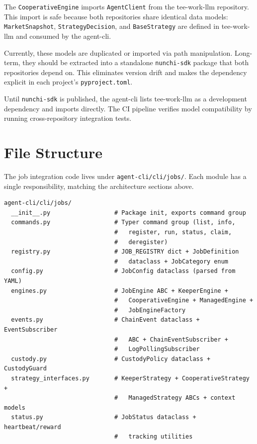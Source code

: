 \documentclass[11pt,a4paper]{article}
\begin{document}
\begin{designbox}
The \texttt{CooperativeEngine} imports \texttt{AgentClient} from the tee-work-llm
repository. This import is safe because both repositories share identical data
models: \texttt{MarketSnapshot}, \texttt{StrategyDecision}, and \texttt{BaseStrategy}
are defined in tee-work-llm and consumed by the agent-cli.

Currently, these models are duplicated or imported via path manipulation. Long-term,
they should be extracted into a standalone \texttt{nunchi-sdk} package that both
repositories depend on. This eliminates version drift and makes the dependency
explicit in each project's \texttt{pyproject.toml}.

Until \texttt{nunchi-sdk} is published, the agent-cli lists tee-work-llm as a
development dependency and imports directly. The CI pipeline verifies model
compatibility by running cross-repository integration tests.
\end{designbox}

\section{File Structure}

The job integration code lives under \texttt{agent-cli/cli/jobs/}. Each module
has a single responsibility, matching the architecture sections above.

\begin{lstlisting}[language={}]
agent-cli/cli/jobs/
  __init__.py                  # Package init, exports command group
  commands.py                  # Typer command group (list, info,
                               #   register, run, status, claim,
                               #   deregister)
  registry.py                  # JOB_REGISTRY dict + JobDefinition
                               #   dataclass + JobCategory enum
  config.py                    # JobConfig dataclass (parsed from YAML)
  engines.py                   # JobEngine ABC + KeeperEngine +
                               #   CooperativeEngine + ManagedEngine +
                               #   JobEngineFactory
  events.py                    # ChainEvent dataclass + EventSubscriber
                               #   ABC + ChainEventSubscriber +
                               #   LogPollingSubscriber
  custody.py                   # CustodyPolicy dataclass + CustodyGuard
  strategy_interfaces.py       # KeeperStrategy + CooperativeStrategy +
                               #   ManagedStrategy ABCs + context models
  status.py                    # JobStatus dataclass + heartbeat/reward
                               #   tracking utilities
\end{lstlisting}
\end{document}
